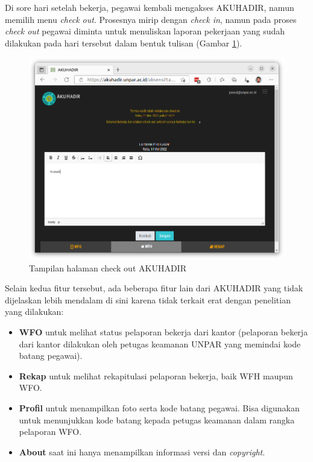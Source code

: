 Di sore hari setelah bekerja, pegawai kembali mengakses AKUHADIR, namun memilih menu \textit{check out}. Prosesnya mirip dengan \textit{check in}, namun pada proses \textit{check out} pegawai diminta untuk menuliskan laporan pekerjaan yang sudah dilakukan pada hari tersebut dalam bentuk tulisan (Gambar \ref{fig:akuhadir-4-wfh-checkout}).

\begin{figure}[H]
	\centering
	\includegraphics[scale=0.3]{Gambar/akuhadir-4-wfh-checkout.png}
	\caption{Tampilan halaman check out AKUHADIR} 
	\label{fig:akuhadir-4-wfh-checkout}
\end{figure}

Selain kedua fitur tersebut, ada beberapa fitur lain dari AKUHADIR yang tidak dijelaskan lebih mendalam di sini karena tidak terkait erat dengan penelitian yang dilakukan:

\begin{itemize}
	\item \textbf{WFO} untuk melihat status pelaporan bekerja dari kantor (pelaporan bekerja dari kantor dilakukan oleh petugas keamanan UNPAR yang memindai kode batang pegawai).
	\item \textbf{Rekap} untuk melihat rekapitulasi pelaporan bekerja, baik WFH maupun WFO.
	\item \textbf{Profil} untuk menampilkan foto serta kode batang pegawai. Bisa digunakan untuk menunjukkan kode batang kepada petugas keamanan dalam rangka pelaporan WFO.
	\item \textbf{About} saat ini hanya menampilkan informasi versi dan \textit{copyright}.
\end{itemize}

